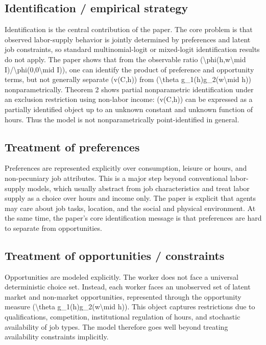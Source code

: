 \documentclass[11pt,a4paper]{article}
\begin{document}
\subsection*{Identification / empirical strategy}
Identification is the central contribution of the paper. The core problem is that observed labor-supply behavior is jointly determined by preferences and latent job constraints, so standard multinomial-logit or mixed-logit identification results do not apply. The paper shows that from the observable ratio (\textbackslash{}phi(h,w\textbackslash{}mid I)/\textbackslash{}phi(0,0\textbackslash{}mid I)), one can identify the product of preference and opportunity terms, but not generally separate (v(C,h)) from (\textbackslash{}theta g\_1(h)g\_2(w\textbackslash{}mid h)) nonparametrically. Theorem 2 shows partial nonparametric identification under an exclusion restriction using non-labor income: (v(C,h)) can be expressed as a partially identified object up to an unknown constant and unknown function of hours. Thus the model is not nonparametrically point-identified in general.

\subsection*{Treatment of preferences}
Preferences are represented explicitly over consumption, leisure or hours, and non-pecuniary job attributes. This is a major step beyond conventional labor-supply models, which usually abstract from job characteristics and treat labor supply as a choice over hours and income only. The paper is explicit that agents may care about job tasks, location, and the social and physical environment. At the same time, the paper’s core identification message is that preferences are hard to separate from opportunities.

\subsection*{Treatment of opportunities / constraints}
Opportunities are modeled explicitly. The worker does not face a universal deterministic choice set. Instead, each worker faces an unobserved set of latent market and non-market opportunities, represented through the opportunity measure (\textbackslash{}theta g\_1(h)g\_2(w\textbackslash{}mid h)). This object captures restrictions due to qualifications, competition, institutional regulation of hours, and stochastic availability of job types. The model therefore goes well beyond treating availability constraints implicitly.
\end{document}

